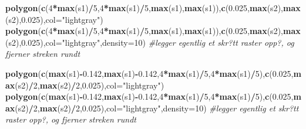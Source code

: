 \documentclass[]{article}
\newenvironment{Shaded}{\begin{snugshade}}{\end{snugshade}}
\newcommand{\CommentTok}[1]{\textcolor[rgb]{0.56,0.35,0.01}{\textit{#1}}}
\newcommand{\DataTypeTok}[1]{\textcolor[rgb]{0.13,0.29,0.53}{#1}}
\newcommand{\DecValTok}[1]{\textcolor[rgb]{0.00,0.00,0.81}{#1}}
\newcommand{\FloatTok}[1]{\textcolor[rgb]{0.00,0.00,0.81}{#1}}
\newcommand{\KeywordTok}[1]{\textcolor[rgb]{0.13,0.29,0.53}{\textbf{#1}}}
\newcommand{\NormalTok}[1]{#1}
\newcommand{\OperatorTok}[1]{\textcolor[rgb]{0.81,0.36,0.00}{\textbf{#1}}}
\newcommand{\StringTok}[1]{\textcolor[rgb]{0.31,0.60,0.02}{#1}}
\begin{document}
\begin{Shaded}
\begin{Highlighting}[]
\KeywordTok{polygon}\NormalTok{(}\KeywordTok{c}\NormalTok{(}\DecValTok{4}\OperatorTok{*}\KeywordTok{max}\NormalTok{(s1)}\OperatorTok{/}\DecValTok{5}\NormalTok{,}\DecValTok{4}\OperatorTok{*}\KeywordTok{max}\NormalTok{(s1)}\OperatorTok{/}\DecValTok{5}\NormalTok{,}\KeywordTok{max}\NormalTok{(s1),}\KeywordTok{max}\NormalTok{(s1)),}\KeywordTok{c}\NormalTok{(}\FloatTok{0.025}\NormalTok{,}\KeywordTok{max}\NormalTok{(s2),}\KeywordTok{max}\NormalTok{(s2),}\FloatTok{0.025}\NormalTok{),}\DataTypeTok{col=}\StringTok{"lightgray"}\NormalTok{)}
\KeywordTok{polygon}\NormalTok{(}\KeywordTok{c}\NormalTok{(}\DecValTok{4}\OperatorTok{*}\KeywordTok{max}\NormalTok{(s1)}\OperatorTok{/}\DecValTok{5}\NormalTok{,}\DecValTok{4}\OperatorTok{*}\KeywordTok{max}\NormalTok{(s1)}\OperatorTok{/}\DecValTok{5}\NormalTok{,}\KeywordTok{max}\NormalTok{(s1),}\KeywordTok{max}\NormalTok{(s1)),}\KeywordTok{c}\NormalTok{(}\FloatTok{0.025}\NormalTok{,}\KeywordTok{max}\NormalTok{(s2),}\KeywordTok{max}\NormalTok{(s2),}\FloatTok{0.025}\NormalTok{),}\DataTypeTok{col=}\StringTok{"lightgray"}\NormalTok{,}\DataTypeTok{density=}\DecValTok{10}\NormalTok{) }\CommentTok{#legger egentlig et skr?tt raster opp?, og fjerner streken rundt}

\KeywordTok{polygon}\NormalTok{(}\KeywordTok{c}\NormalTok{(}\KeywordTok{max}\NormalTok{(s1)}\OperatorTok{-}\FloatTok{0.142}\NormalTok{,}\KeywordTok{max}\NormalTok{(s1)}\OperatorTok{-}\FloatTok{0.142}\NormalTok{,}\DecValTok{4}\OperatorTok{*}\KeywordTok{max}\NormalTok{(s1)}\OperatorTok{/}\DecValTok{5}\NormalTok{,}\DecValTok{4}\OperatorTok{*}\KeywordTok{max}\NormalTok{(s1)}\OperatorTok{/}\DecValTok{5}\NormalTok{),}\KeywordTok{c}\NormalTok{(}\FloatTok{0.025}\NormalTok{,}\KeywordTok{max}\NormalTok{(s2)}\OperatorTok{/}\DecValTok{2}\NormalTok{,}\KeywordTok{max}\NormalTok{(s2)}\OperatorTok{/}\DecValTok{2}\NormalTok{,}\FloatTok{0.025}\NormalTok{),}\DataTypeTok{col=}\StringTok{"lightgray"}\NormalTok{)}
\KeywordTok{polygon}\NormalTok{(}\KeywordTok{c}\NormalTok{(}\KeywordTok{max}\NormalTok{(s1)}\OperatorTok{-}\FloatTok{0.142}\NormalTok{,}\KeywordTok{max}\NormalTok{(s1)}\OperatorTok{-}\FloatTok{0.142}\NormalTok{,}\DecValTok{4}\OperatorTok{*}\KeywordTok{max}\NormalTok{(s1)}\OperatorTok{/}\DecValTok{5}\NormalTok{,}\DecValTok{4}\OperatorTok{*}\KeywordTok{max}\NormalTok{(s1)}\OperatorTok{/}\DecValTok{5}\NormalTok{),}\KeywordTok{c}\NormalTok{(}\FloatTok{0.025}\NormalTok{,}\KeywordTok{max}\NormalTok{(s2)}\OperatorTok{/}\DecValTok{2}\NormalTok{,}\KeywordTok{max}\NormalTok{(s2)}\OperatorTok{/}\DecValTok{2}\NormalTok{,}\FloatTok{0.025}\NormalTok{),}\DataTypeTok{col=}\StringTok{"lightgray"}\NormalTok{,}\DataTypeTok{density=}\DecValTok{10}\NormalTok{) }\CommentTok{#legger egentlig et skr?tt raster opp?, og fjerner streken rundt}


\end{Highlighting}
\end{Shaded}
\end{document}
